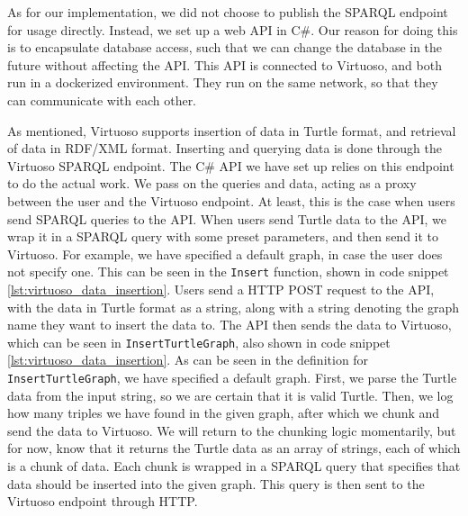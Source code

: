 As for our implementation, we did not choose to publish the SPARQL endpoint for \knox{} usage directly. Instead, we set up a web API in C\#.
Our reason for doing this is to encapsulate database access, such that we can change the database in the future without affecting the API.
This API is connected to Virtuoso, and both run in a dockerized environment. They run on the same network, so that they can communicate with each other.

As mentioned, Virtuoso supports insertion of data in Turtle format, and retrieval of data in RDF/XML format. Inserting and querying data is done through the Virtuoso SPARQL endpoint. The C\# API we have set up relies on this endpoint to do the actual work. We pass on the queries and data, acting as a proxy between the user and the Virtuoso endpoint. At least, this is the case when users send SPARQL queries to the API. When users send Turtle data to the API, we wrap it in a SPARQL query with some preset parameters, and then send it to Virtuoso. For example, we have specified a default graph, in case the user does not specify one.
This can be seen in the \texttt{Insert} function, shown in code snippet \ref{lst:virtuoso_data_insertion}. Users send a HTTP POST request to the API, with the data in Turtle format as a string, along with a string denoting the graph name they want to insert the data to. The API then sends the data to Virtuoso, which can be seen in \texttt{InsertTurtleGraph}, also shown in code snippet \ref{lst:virtuoso_data_insertion}. As can be seen in the definition for \texttt{InsertTurtleGraph}, we have specified a default graph. First, we parse the Turtle data from the input string, so we are certain that it is valid Turtle. Then, we log how many triples we have found in the given graph, after which we chunk and send the data to Virtuoso. We will return to the chunking logic momentarily, but for now, know that it returns the Turtle data as an array of strings, each of which is a chunk of data. Each chunk is wrapped in a SPARQL query that specifies that data should be inserted into the given graph. This query is then sent to the Virtuoso endpoint through HTTP.



